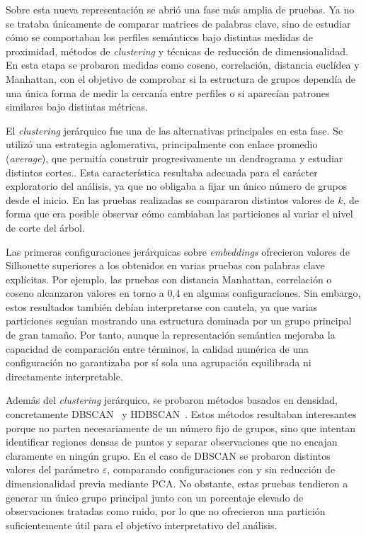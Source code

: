 \documentclass[11pt,spanish,listoffigures,listoftables]{tfgetsinf}
\begin{document}
Sobre esta nueva representación se abrió una fase más amplia de pruebas. Ya no se trataba únicamente de comparar matrices de palabras clave, sino de estudiar cómo se comportaban los perfiles semánticos bajo distintas medidas de proximidad, métodos de \textit{clustering} y técnicas de reducción de dimensionalidad. En esta etapa se probaron medidas como coseno, correlación, distancia euclídea y Manhattan, con el objetivo de comprobar si la estructura de grupos dependía de una única forma de medir la cercanía entre perfiles o si aparecían patrones similares bajo distintas métricas.

El \textit{clustering} jerárquico fue una de las alternativas principales en esta fase. Se utilizó una estrategia aglomerativa, principalmente con enlace promedio (\textit{average}), que permitía construir progresivamente un dendrograma y estudiar distintos cortes.. Esta característica resultaba adecuada para el carácter exploratorio del análisis, ya que no obligaba a fijar un único número de grupos desde el inicio. En las pruebas realizadas se compararon distintos valores de \(k\), de forma que era posible observar cómo cambiaban las particiones al variar el nivel de corte del árbol.

Las primeras configuraciones jerárquicas sobre \textit{embeddings} ofrecieron valores de Silhouette superiores a los obtenidos en varias pruebas con palabras clave explícitas. Por ejemplo, las pruebas con distancia Manhattan, correlación o coseno alcanzaron valores en torno a 0,4 en algunas configuraciones. Sin embargo, estos resultados también debían interpretarse con cautela, ya que varias particiones seguían mostrando una estructura dominada por un grupo principal de gran tamaño. Por tanto, aunque la representación semántica mejoraba la capacidad de comparación entre términos, la calidad numérica de una configuración no garantizaba por sí sola una agrupación equilibrada ni directamente interpretable.

Además del \textit{clustering} jerárquico, se probaron métodos basados en densidad, concretamente DBSCAN~\cite{dbscan} y HDBSCAN~\cite{hdbscan}. Estos métodos resultaban interesantes porque no parten necesariamente de un número fijo de grupos, sino que intentan identificar regiones densas de puntos y separar observaciones que no encajan claramente en ningún grupo. En el caso de DBSCAN se probaron distintos valores del parámetro \(\varepsilon\), comparando configuraciones con y sin reducción de dimensionalidad previa mediante PCA. No obstante, estas pruebas tendieron a generar un único grupo principal junto con un porcentaje elevado de observaciones tratadas como ruido, por lo que no ofrecieron una partición suficientemente útil para el objetivo interpretativo del análisis.
\end{document}
